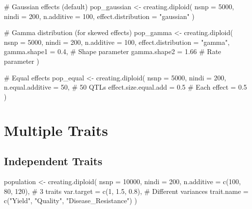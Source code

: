 \documentclass[
  letterpaper,
]{book}
\newenvironment{Shaded}{\begin{snugshade}}{\end{snugshade}}
\newcommand{\AttributeTok}[1]{\textcolor[rgb]{0.40,0.45,0.13}{#1}}
\newcommand{\CommentTok}[1]{\textcolor[rgb]{0.37,0.37,0.37}{#1}}
\newcommand{\DecValTok}[1]{\textcolor[rgb]{0.68,0.00,0.00}{#1}}
\newcommand{\FloatTok}[1]{\textcolor[rgb]{0.68,0.00,0.00}{#1}}
\newcommand{\FunctionTok}[1]{\textcolor[rgb]{0.28,0.35,0.67}{#1}}
\newcommand{\NormalTok}[1]{\textcolor[rgb]{0.00,0.23,0.31}{#1}}
\newcommand{\OtherTok}[1]{\textcolor[rgb]{0.00,0.23,0.31}{#1}}
\newcommand{\StringTok}[1]{\textcolor[rgb]{0.13,0.47,0.30}{#1}}
\begin{document}
\begin{Shaded}
\begin{Highlighting}[]
\CommentTok{\# Gaussian effects (default)}
\NormalTok{pop\_gaussian }\OtherTok{\textless{}{-}} \FunctionTok{creating.diploid}\NormalTok{(}
  \AttributeTok{nsnp =} \DecValTok{5000}\NormalTok{, }\AttributeTok{nindi =} \DecValTok{200}\NormalTok{, }\AttributeTok{n.additive =} \DecValTok{100}\NormalTok{,}
  \AttributeTok{effect.distribution =} \StringTok{"gaussian"}
\NormalTok{)}

\CommentTok{\# Gamma distribution (for skewed effects)}
\NormalTok{pop\_gamma }\OtherTok{\textless{}{-}} \FunctionTok{creating.diploid}\NormalTok{(}
  \AttributeTok{nsnp =} \DecValTok{5000}\NormalTok{, }\AttributeTok{nindi =} \DecValTok{200}\NormalTok{, }\AttributeTok{n.additive =} \DecValTok{100}\NormalTok{,}
  \AttributeTok{effect.distribution =} \StringTok{"gamma"}\NormalTok{,}
  \AttributeTok{gamma.shape1 =} \FloatTok{0.4}\NormalTok{,    }\CommentTok{\# Shape parameter}
  \AttributeTok{gamma.shape2 =} \FloatTok{1.66}    \CommentTok{\# Rate parameter}
\NormalTok{)}

\CommentTok{\# Equal effects}
\NormalTok{pop\_equal }\OtherTok{\textless{}{-}} \FunctionTok{creating.diploid}\NormalTok{(}
  \AttributeTok{nsnp =} \DecValTok{5000}\NormalTok{, }\AttributeTok{nindi =} \DecValTok{200}\NormalTok{,}
  \AttributeTok{n.equal.additive =} \DecValTok{50}\NormalTok{,           }\CommentTok{\# 50 QTLs}
  \AttributeTok{effect.size.equal.add =} \FloatTok{0.5}      \CommentTok{\# Each effect = 0.5}
\NormalTok{)}
\end{Highlighting}
\end{Shaded}

\section{Multiple Traits}\label{sec-multiple-traits}

\subsection{Independent Traits}\label{independent-traits}

\begin{Shaded}
\begin{Highlighting}[]
\NormalTok{population }\OtherTok{\textless{}{-}} \FunctionTok{creating.diploid}\NormalTok{(}
  \AttributeTok{nsnp =} \DecValTok{10000}\NormalTok{,}
  \AttributeTok{nindi =} \DecValTok{200}\NormalTok{,}
  \AttributeTok{n.additive =} \FunctionTok{c}\NormalTok{(}\DecValTok{100}\NormalTok{, }\DecValTok{80}\NormalTok{, }\DecValTok{120}\NormalTok{),    }\CommentTok{\# 3 traits}
  \AttributeTok{var.target =} \FunctionTok{c}\NormalTok{(}\DecValTok{1}\NormalTok{, }\FloatTok{1.5}\NormalTok{, }\FloatTok{0.8}\NormalTok{),     }\CommentTok{\# Different variances}
  \AttributeTok{trait.name =} \FunctionTok{c}\NormalTok{(}\StringTok{"Yield"}\NormalTok{, }\StringTok{"Quality"}\NormalTok{, }\StringTok{"Disease\_Resistance"}\NormalTok{)}
\NormalTok{)}
\end{Highlighting}
\end{Shaded}
\end{document}
